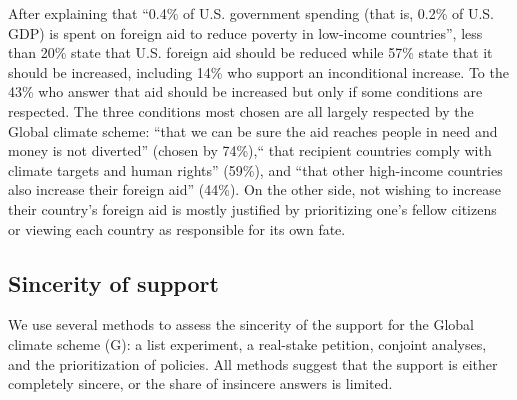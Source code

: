 \documentclass{nature}
\begin{document}
After explaining that ``0.4\% of U.S. government spending (that is, 0.2\% of U.S. GDP) is spent on foreign aid to reduce poverty in low-income countries'', less than 20\% state that U.S. foreign aid should be reduced while 57\% state that it should be increased, including 14\% who support an inconditional increase. To the 43\% who answer that aid should be increased but only if some conditions are respected. The three conditions most chosen are all largely respected by the Global climate scheme: ``that we can be sure the aid reaches people in need and money is not diverted'' (chosen by 74\%),`` that recipient countries comply with climate targets and human rights'' (59\%), and ``that other high-income countries also increase their foreign aid'' (44\%). %
On the other side, not wishing to increase their country's foreign aid is mostly justified by prioritizing one's fellow citizens or viewing each country as responsible for its own fate. 

\subsection{Sincerity of support}

We use several methods to assess the sincerity of the support for the Global climate scheme (G): a list experiment, a real-stake petition, conjoint analyses, and the prioritization of policies. All methods suggest that the support is either completely sincere, or the share of insincere answers is limited. 
\end{document}
